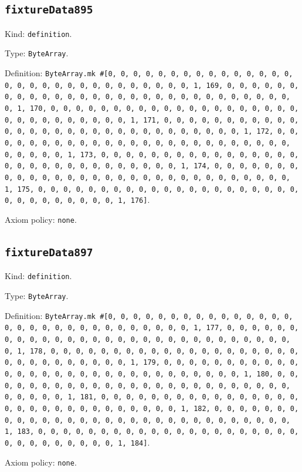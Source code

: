 \documentclass[11pt]{article}
\begin{document}
\subsection*{\texttt{fixtureData895}}
\noindent Kind: \texttt{definition}.\par
\noindent Type: \texttt{ByteArray}.\par
\noindent Definition: \texttt{ByteArray.mk \#[0, 0, 0, 0, 0, 0, 0, 0, 0, 0, 0, 0, 0, 0, 0, 0, 0, 0, 0, 0, 0, 0, 0, 0, 0, 0, 0, 0, 0, 0, 1, 169, 0, 0, 0, 0, 0, 0, 0, 0, 0, 0, 0, 0, 0, 0, 0, 0, 0, 0, 0, 0, 0, 0, 0, 0, 0, 0, 0, 0, 0, 0, 1, 170, 0, 0, 0, 0, 0, 0, 0, 0, 0, 0, 0, 0, 0, 0, 0, 0, 0, 0, 0, 0, 0, 0, 0, 0, 0, 0, 0, 0, 0, 0, 1, 171, 0, 0, 0, 0, 0, 0, 0, 0, 0, 0, 0, 0, 0, 0, 0, 0, 0, 0, 0, 0, 0, 0, 0, 0, 0, 0, 0, 0, 0, 0, 1, 172, 0, 0, 0, 0, 0, 0, 0, 0, 0, 0, 0, 0, 0, 0, 0, 0, 0, 0, 0, 0, 0, 0, 0, 0, 0, 0, 0, 0, 0, 0, 1, 173, 0, 0, 0, 0, 0, 0, 0, 0, 0, 0, 0, 0, 0, 0, 0, 0, 0, 0, 0, 0, 0, 0, 0, 0, 0, 0, 0, 0, 0, 0, 1, 174, 0, 0, 0, 0, 0, 0, 0, 0, 0, 0, 0, 0, 0, 0, 0, 0, 0, 0, 0, 0, 0, 0, 0, 0, 0, 0, 0, 0, 0, 0, 1, 175, 0, 0, 0, 0, 0, 0, 0, 0, 0, 0, 0, 0, 0, 0, 0, 0, 0, 0, 0, 0, 0, 0, 0, 0, 0, 0, 0, 0, 0, 0, 1, 176]}.\par
\noindent Axiom policy: \texttt{none}.\par
\subsection*{\texttt{fixtureData897}}
\noindent Kind: \texttt{definition}.\par
\noindent Type: \texttt{ByteArray}.\par
\noindent Definition: \texttt{ByteArray.mk \#[0, 0, 0, 0, 0, 0, 0, 0, 0, 0, 0, 0, 0, 0, 0, 0, 0, 0, 0, 0, 0, 0, 0, 0, 0, 0, 0, 0, 0, 0, 1, 177, 0, 0, 0, 0, 0, 0, 0, 0, 0, 0, 0, 0, 0, 0, 0, 0, 0, 0, 0, 0, 0, 0, 0, 0, 0, 0, 0, 0, 0, 0, 1, 178, 0, 0, 0, 0, 0, 0, 0, 0, 0, 0, 0, 0, 0, 0, 0, 0, 0, 0, 0, 0, 0, 0, 0, 0, 0, 0, 0, 0, 0, 0, 1, 179, 0, 0, 0, 0, 0, 0, 0, 0, 0, 0, 0, 0, 0, 0, 0, 0, 0, 0, 0, 0, 0, 0, 0, 0, 0, 0, 0, 0, 0, 0, 1, 180, 0, 0, 0, 0, 0, 0, 0, 0, 0, 0, 0, 0, 0, 0, 0, 0, 0, 0, 0, 0, 0, 0, 0, 0, 0, 0, 0, 0, 0, 0, 1, 181, 0, 0, 0, 0, 0, 0, 0, 0, 0, 0, 0, 0, 0, 0, 0, 0, 0, 0, 0, 0, 0, 0, 0, 0, 0, 0, 0, 0, 0, 0, 1, 182, 0, 0, 0, 0, 0, 0, 0, 0, 0, 0, 0, 0, 0, 0, 0, 0, 0, 0, 0, 0, 0, 0, 0, 0, 0, 0, 0, 0, 0, 0, 1, 183, 0, 0, 0, 0, 0, 0, 0, 0, 0, 0, 0, 0, 0, 0, 0, 0, 0, 0, 0, 0, 0, 0, 0, 0, 0, 0, 0, 0, 0, 0, 1, 184]}.\par
\noindent Axiom policy: \texttt{none}.\par
\end{document}
